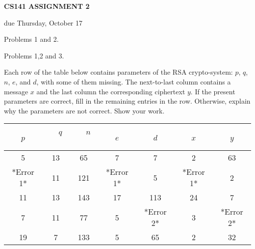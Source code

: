 \documentclass{article}
\begin{document}

\centerline{\large \bf CS141 ASSIGNMENT 2}
\centerline{due Thursday, October 17}

\vskip 0.2in
 Problems 1 and 2.

 Problems 1,2 and 3.

\vskip 0.2in


\begin{problem} 
Each row of the table below contains parameters of the
RSA crypto-system: $p$, $q$, $n$, $e$, and $d$, with some
of them missing. The next-to-last column contains a 
message $x$ and the last column the corresponding ciphertext $y$.
If the present parameters are correct,
fill in the remaining entries in the row.
Otherwise, explain why the parameters are not correct. Show your work.

\vskip 0.2in

\noindent
\begin{tabular}{|c|c|c|c|c||c|c|}
\hline
\ \ $p$\ \ &\ \ $q$\ \ &\ \ $n$\ \ &\ \ $e$\ \ &\ \ $d$\ \ &\ \ $x$\ \ &\ \ $y$\ \ 
\\ \hline
5 & 13  & 65 & 7  & 7 & 2  & 63 \\
\hline
%
*Error 1*  & 11  & 121 & *Error 1*  & 5  & *Error 1* & 2 \\
\hline
%
11 & 13  & 143 & 17  & 113 & 24 & 7 \\
\hline
%
7 & 11  & 77 & 5  & *Error 2* & 3  & *Error 2* \\
\hline
%
19 & 7  & 133 & 5  & 65 & 2  & 32 \\
\hline
\end{tabular}


\end{problem}
\end{document}
